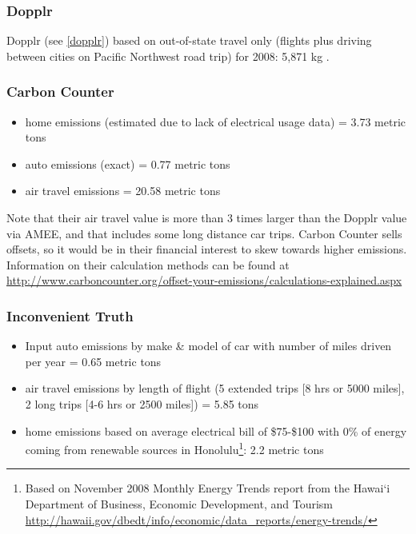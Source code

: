 \subsubsection{Dopplr}
Dopplr (see \autoref{dopplr}) based on out-of-state travel only (flights plus driving between cities on Pacific Northwest road trip) for 2008: 5,871 kg \COtwo.

\subsubsection{Carbon Counter}
\begin{itemize}
	\item home emissions (estimated due to lack of electrical usage data) = 3.73 metric tons \COtwo
	\item auto emissions (exact) = 0.77 metric tons \COtwo
	\item air travel emissions = 20.58 metric tons \COtwo
\end{itemize}

Note that their air travel \COtwo value is more than 3 times larger than the Dopplr value via AMEE, and that includes some long distance car trips. Carbon Counter sells offsets, so it would be in their financial interest to skew towards higher emissions. Information on their calculation methods can be found at \url{http://www.carboncounter.org/offset-your-emissions/calculations-explained.aspx}

\subsubsection{Inconvenient Truth}
\begin{itemize}
	\item Input auto emissions by make \& model of car with number of miles driven per year = 0.65 metric tons \COtwo
	\item air travel emissions by length of flight (5 extended trips [8 hrs or 5000 miles], 2 long trips [4-6 hrs or 2500 miles]) = 5.85 tons \COtwo
	\item home emissions based on average electrical bill of \$75-\$100 with 0\% of energy coming from renewable sources in Honolulu\footnote{Based on November 2008 Monthly Energy Trends report from the Hawai`i Department of Business, Economic Development, and Tourism \url{http://hawaii.gov/dbedt/info/economic/data_reports/energy-trends/}}: 2.2 metric tons \COtwo
\end{itemize}